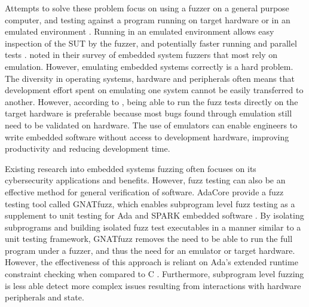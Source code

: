 \documentclass[../report.tex]{subfiles}
\begin{document}
Attempts to solve these problem focus on using a fuzzer on a general purpose
computer, and testing against a program running on target hardware or in an
emulated environment \citep{Eisele_et_al_2022}. Running in an emulated
environment allows easy inspection of the SUT by the fuzzer, and potentially
faster running and parallel tests \citep{Eisele_et_al_2022}. \citet{Yun_2022}
noted in their survey of embedded system fuzzers that most rely on emulation.
However, emulating embedded systems correctly is a hard problem. The
diversity in operating systems, hardware and peripherals often means that
development effort spent on emulating one system cannot be easily transferred
to another. However, according to \citet{Eisele_et_al_2022}, being able to run
the fuzz tests directly on the target hardware is preferable because most bugs
found through emulation still need to be validated on hardware. The use of
emulators can enable engineers to write embedded software without access to
development hardware, improving productivity and reducing development time.

Existing research into embedded systems fuzzing often focuses on its
cybersecurity applications and benefits. However, fuzz testing can also be an
effective method for general verification of software. AdaCore provide a fuzz
testing tool called GNATfuzz, which enables subprogram level fuzz testing as a
supplement to unit testing for Ada and SPARK embedded software
\citep{gnatfuzz}. By isolating subprograms and building isolated fuzz test
executables in a manner similar to a unit testing framework, GNATfuzz removes
the need to be able to run the full program under a fuzzer, and thus the need
for an emulator or target hardware. However, the effectiveness of this approach
is reliant on Ada's extended runtime constraint checking when compared to C
\citep{gnatfuzz}. Furthermore, subprogram level fuzzing is less able detect
more complex issues resulting from interactions with hardware peripherals and
state.
\end{document}

